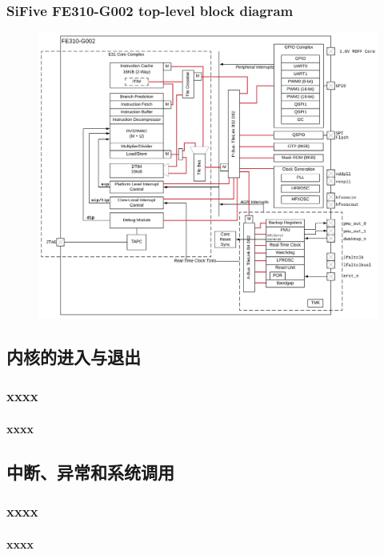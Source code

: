 % 
\begin{frame}
	\frametitle{SiFive FE310-G002 top-level block diagram}
\begin{figure}
    \includegraphics[width=1.0\linewidth]{sifive-board}
\end{figure}
\end{frame}
% 
% 
\subsection{内核的进入与退出}
\begin{frame}
	\frametitle{xxxx}
	\framesubtitle{xxxx}
\end{frame}

% 
% 
% 

\subsection{中断、异常和系统调用}
\begin{frame}
	\frametitle{xxxx}
	\framesubtitle{xxxx}
\end{frame}


